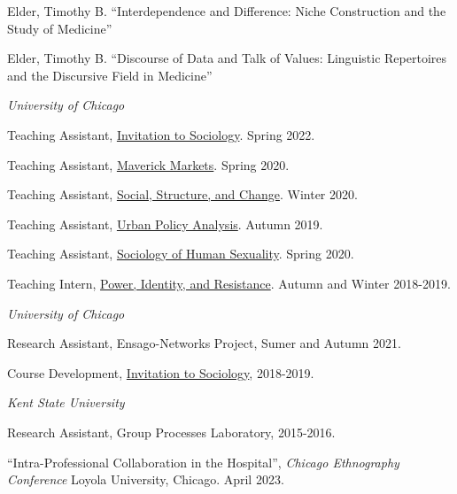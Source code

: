 \documentclass[11pt,article,oneside]{memoir}
\begin{document}
\ind Elder, Timothy B. ``Interdependence and Difference: Niche Construction and the Study of Medicine'' \vspace{0.05in}

\ind Elder, Timothy B. ``Discourse of Data and Talk of Values: Linguistic Repertoires and the Discursive Field in Medicine'' \vspace{0.05in}

\bigskip

\medskip
\noindent\emph{University of Chicago \vspace{0.01in}}

\ind Teaching Assistant, \underline{Invitation to Sociology}. Spring 2022.

\ind Teaching Assistant, \underline{Maverick Markets}. Spring 2020.

\ind Teaching Assistant, \underline{Social, Structure, and Change}. Winter 2020.

\ind Teaching Assistant, \underline{Urban Policy Analysis}. Autumn 2019.

\ind Teaching Assistant, \underline{Sociology of Human Sexuality}. Spring 2020.

\ind Teaching Intern, \underline{Power, Identity, and Resistance}. Autumn and Winter 2018-2019.

\bigskip

\medskip
\noindent\emph{University of Chicago \vspace{0.01in}}

\ind Research Assistant, Ensago-Networks Project, Sumer and Autumn 2021. \vspace{0.05in}

\ind Course Development, \underline{Invitation to Sociology}, 2018-2019. \vspace{0.05in}

\smallskip
\noindent\emph{Kent State University \vspace{0.01in}}

\ind Research Assistant, Group Processes Laboratory, 2015-2016. \vspace{0.1in}

\normalsize

\bigskip

\medskip

\ind ``Intra-Professional Collaboration in the Hospital'', \emph{Chicago Ethnography Conference} Loyola University, Chicago. April 2023. \vspace{0.05in}
\end{document}
